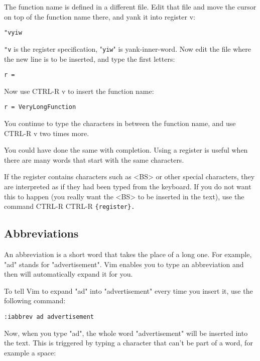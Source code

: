 The function name is defined in a different file.
Edit that file and move the cursor on top of the function name there, and yank it into register v:

\begin{Verbatim}[samepage=true]
 "vyiw
\end{Verbatim}

\verb!"v! is the register specification, "\verb!yiw!" is yank-inner-word.
Now edit the file where the new line is to be inserted, and type the first letters:

\begin{Verbatim}[samepage=true]
    r = 
\end{Verbatim}

Now use CTRL-R v to insert the function name:

\begin{Verbatim}[samepage=true]
    r = VeryLongFunction 
\end{Verbatim}

You continue to type the characters in between the function name, and use CTRL-R v two times more.

You could have done the same with completion.
Using a register is useful when there are many words that start with the same characters.

If the register contains characters such as <BS> or other special characters, they are interpreted as if they had been typed from the keyboard.
If you do not want this to happen (you really want the <BS> to be inserted in the text), use the command CTRL-R CTRL-R \verb!{register}.!
\subsection{Abbreviations}
An abbreviation is a short word that takes the place of a long one.
For example, "ad" stands for "advertisement".
Vim enables you to type an abbreviation and then will automatically expand it for you.

To tell Vim to expand "ad" into "advertisement" every time you insert it, use the following command:

\begin{Verbatim}[samepage=true]
 :iabbrev ad advertisement
\end{Verbatim}

Now, when you type "ad", the whole word "advertisement" will be inserted into the text.
This is triggered by typing a character that can't be part of a word, for example a space:

